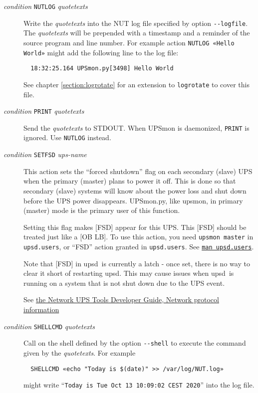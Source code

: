 \documentclass[12pt]{article}
\newcommand{\upsd}{\mbox{\textcolor{UPSDCOLOUR}{upsd}}}
\newcommand{\upsmon}{\mbox{\textcolor{MONCOLOUR}{upsmon}}}
\newcommand{\UPSmon}{\mbox{\textcolor{UPSMONCOLOUR}{UPSmon.py}}}
\newcommand{\status}[1]{\textcolor{UPSDCOLOUR}{[{#1}]}}
\newcommand{\upsdusers}{\textcolor{UPSDCOLOUR}{\texttt{upsd.users}}}
\newcommand{\NUTman}[1]{\href{http://networkupstools.org/docs/man/#1.html}{\texttt{man #1}}}
\begin{document}
\begin{description}
\begin{description}
\item[\textit{condition} \texttt{NUTLOG} \textit{quotetexts}] \hspace{7mm}
  Write the \textit{quotetexts} into the NUT log file specified by option
  \texttt{-\/-logfile}.  The \textit{quotetexts} will be prepended with a
  timestamp and a reminder of the source program and line number.  For example
  action \texttt{NUTLOG «Hello World»} might add the following line to the log
  file:
  \begin{verbatim}
  18:32:25.164 UPSmon.py[3498] Hello World\end{verbatim}
  See chapter \ref{section:logrotate} for an extension to \texttt{logrotate}
  to cover this file.

\item[\textit{condition} \texttt{PRINT} \textit{quotetexts}] \hspace{7mm}
  Send the \textit{quotetexts} to STDOUT.  When UPSmon is daemonized,
  \texttt{PRINT} is ignored.  Use \texttt{NUTLOG} instead.

\item[\textit{condition} \texttt{SETFSD} \textit{ups-name}] \hspace{7mm} This
  action sets the ``forced shutdown'' flag on each secondary (slave) UPS when
  the primary (master) plans to power it off. This is done so that secondary
  (slave) systems will know about the power loss and shut down before the UPS
  power disappears.  \UPSmon, like \upsmon, in primary (master) mode is the
  primary user of this function.

Setting this flag makes \status{FSD} appear for this UPS.  This \status{FSD}
should be treated just like a \status{OB LB}.  To use this action, you need
\texttt{upsmon master} in \upsdusers, or ``FSD'' action granted in \upsdusers.
See \NUTman{upsd.users}. 

Note that \status{FSD} in \upsd\ is currently a latch - once set, there is no
way to clear it short of restarting \upsd.  This may cause issues when
\upsd\ is running on a system that is not shut down due to the UPS event.

See \href{https://networkupstools.org/docs/developer-guide.chunked/ar01s09.html}%
         {the Network UPS Tools Developer Guide, Network protocol information}

\item[\textit{condition} \texttt{SHELLCMD} \textit{quotetexts}] \hspace{7mm}
  Call on the shell defined by the option \texttt{-\/-shell} to execute the
  command given by the \textit{quotetexts}.  For example
  \begin{verbatim}
  SHELLCMD «echo "Today is $(date)" >> /var/log/NUT.log»\end{verbatim}
  might write ``\texttt{Today is Tue Oct 13 10:09:02 CEST 2020}'' into the log file.


\end{description}
\end{description}
\end{document}
